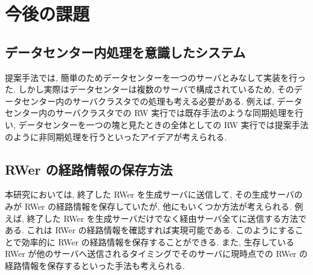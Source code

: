 \section{今後の課題}

\subsection{データセンター内処理を意識したシステム}

提案手法では, 簡単のためデータセンターを一つのサーバとみなして実装を行った. しかし実際はデータセンターは複数のサーバで構成されているため, そのデータセンター内のサーバクラスタでの処理も考える必要がある. 例えば, データセンター内のサーバクラスタでの RW 実行では既存手法のような同期処理を行い, データセンターを一つの塊と見たときの全体としての RW 実行では提案手法のように非同期処理を行うといったアイデアが考えられる. 

\subsection{RWer の経路情報の保存方法}

本研究においては, 終了した RWer を生成サーバに送信して, その生成サーバのみが RWer の経路情報を保存していたが, 他にもいくつか方法が考えられる. 例えば, 終了した RWer を生成サーバだけでなく経由サーバ全てに送信する方法である. これは RWer の経路情報を確認すれば実現可能である. このようにすることで効率的に RWer の経路情報を保存することができる. また, 生存している RWer が他のサーバへ送信されるタイミングでそのサーバに現時点での RWer の経路情報を保存するといった手法も考えられる. 